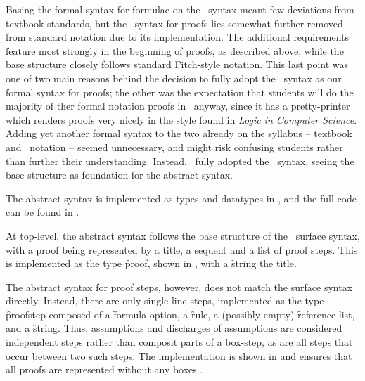 \documentclass[BA.tex]{subfiles}
\begin{document}
 Basing the formal syntax for formulae on the \bp\ syntax meant few
 deviations from textbook standards, but the \bp\ syntax for proofs lies 
 somewhat further removed from standard notation due to its implementation.
 The additional requirements feature most strongly in the beginning of 
 proofs, as described above, while the base structure closely follows 
 standard Fitch-style notation. This last point was one of two main
 reasons behind the decision to fully adopt the \bp\ syntax as our formal
 syntax for proofs; the other was the expectation that students will do
 the majority of ther formal notation proofs in \bp\ anyway, since it has
 a pretty-printer which renders proofs very nicely in the style found in
 \emph{Logic in Computer Science}. Adding yet another formal
 syntax to the two already on the syllabus -- textbook and \bp\ notation --
 seemed unnecessary, and might risk confusing students rather than further
 their understanding. Instead, \we\ fully adopted the \bp\ syntax, seeing
 the base structure as  foundation for the abstract syntax.


The abstract syntax is implemented as types and datatypes in ,
 and the full code can be found in . 

At top-level, the abstract syntax follows the base structure of the
 \bp\ surface syntax, with a proof being represented by a title, a 
 sequent and a list of proof steps. This is implemented as the type
 \f{proof}, shown in , with a \f{string} 
  the title.
 
 
 The abstract syntax for proof steps, however, does not match the surface
 syntax directly. Instead, there are only single-line steps, implemented
 as the type \f{proofstep} composed of a 
 \f{formula option}, a \f{rule}, a (possibly empty) \f{reference list}, 
 and a \f{string}. Thus, assumptions and discharges of assumptions are
 considered independent steps rather than composit parts of a box-step, as
 are all steps that occur between two such steps.
 The implementation is shown in 
  and ensures that all proofs are represented
 without any boxes \chk{or their nesting to arbitrary depth}.

\end{document}
